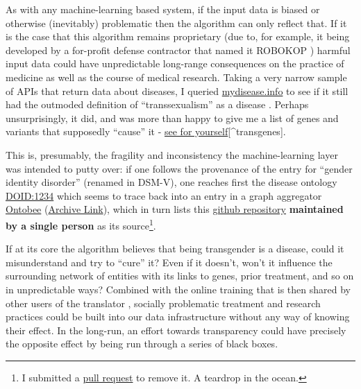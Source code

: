 \documentclass[11pt]{article}
\begin{document}
\begin{multicols}{2}
As with any machine-learning based system, if the input data is biased
or otherwise (inevitably) problematic then the algorithm can only
reflect that. If it is the case that this algorithm remains proprietary
(due to, for example, it being developed by a for-profit defense
contractor that named it ROBOKOP \cite{ROBOKOPCoVar2021} )
harmful input data could have unpredictable long-range consequences on
the practice of medicine as well as the course of medical research.
Taking a very narrow sample of APIs that return data about diseases, I
queried \href{https://mydisease.info}{mydisease.info} to see if it still
had the outmoded definition of ``transsexualism'' as a disease \cite{ramTransphobiaEncodedExamination2021} . Perhaps unsurprisingly, it
did, and was more than happy to give me a list of genes and variants
that supposedly ``cause'' it -
\href{http://mydisease.info/v1/query?q=\%22DOID\%3A10919\%22}{see for
yourself}{[}\^{}transgenes{]}.

This is, presumably, the fragility and inconsistency the
machine-learning layer was intended to putty over: if one follows the
provenance of the entry for ``gender identity disorder'' (renamed in
DSM-V), one reaches first the disease ontology
\href{https://web.archive.org/web/20211007053446/https://www.ebi.ac.uk/ols/ontologies/doid/terms?iri=http\%3A\%2F\%2Fpurl.obolibrary.org\%2Fobo\%2FDOID_1234}{DOID:1234}
which seems to trace back into an entry in a graph aggregator
\href{http://www.ontobee.org/ontology/DOID?iri=http://purl.obolibrary.org/obo/DOID_1234}{Ontobee}
(\href{https://web.archive.org/web/20210923110103/http://www.ontobee.org/ontology/DOID?iri=http://purl.obolibrary.org/obo/DOID_1234}{Archive
Link}), which in turn lists this
\href{https://github.com/jannahastings/mental-functioning-ontology}{github
repository} \textbf{maintained by a single person} as its
source\footnote{I submitted a
  \href{https://github.com/jannahastings/mental-functioning-ontology/pull/8}{pull
  request} to remove it. A teardrop in the ocean.}.

If at its core the algorithm believes that being transgender is a
disease, could it misunderstand and try to ``cure'' it? Even if it
doesn't, won't it influence the surrounding network of entities with its
links to genes, prior treatment, and so on in unpredictable ways?
Combined with the online training that is then shared by other users of
the translator \cite{consortiumUniversalBiomedicalData2019} ,
socially problematic treatment and research practices could be built
into our data infrastructure without any way of knowing their effect. In
the long-run, an effort towards transparency could have precisely the
opposite effect by being run through a series of black boxes.


\end{multicols}
\end{document}
